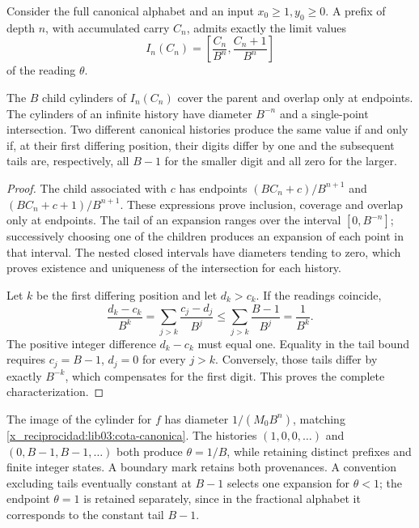 Consider the full canonical alphabet and an input
\(x_0\geq1,y_0\geq0\). A prefix of depth \(n\), with
accumulated carry \(C_n\), admits exactly the limit values
\begin{equation}
 I_n(C_n)=\left[\frac{C_n}{B^n},\frac{C_n+1}{B^n}\right]
 \label{x_reciprocidad:lib03:cilindro}
\end{equation}
of the reading \(\theta\).

\begin{theorem}
\label{x_reciprocidad:lib03:teo-cilindros}
The \(B\) child cylinders of \(I_n(C_n)\) cover the parent and
overlap only at endpoints. The cylinders of an infinite history
have diameter \(B^{-n}\) and a single-point intersection.
Two different canonical histories produce the same value if and only
if, at their first differing position, their digits differ by one and the
subsequent tails are, respectively, all \(B-1\) for the smaller
digit and all zero for the larger.
\end{theorem}

\begin{proof}
The child associated with \(c\) has endpoints
\((BC_n+c)/B^{n+1}\) and \((BC_n+c+1)/B^{n+1}\).
These expressions prove inclusion, coverage and overlap only
at endpoints. The tail of an expansion ranges over the interval
\([0,B^{-n}]\); successively choosing one of the children produces an
expansion of each point in that interval. The nested closed
intervals have diameters tending to zero, which proves existence
and uniqueness of the intersection for each history.

Let \(k\) be the first differing position and let \(d_k>c_k\). If the
readings coincide,
\[
 \frac{d_k-c_k}{B^k}
 =\sum_{j>k}\frac{c_j-d_j}{B^j}
 \leq\sum_{j>k}\frac{B-1}{B^j}=\frac1{B^k}.
\]
The positive integer difference \(d_k-c_k\) must equal one. Equality
in the tail bound requires \(c_j=B-1\), \(d_j=0\) for every
\(j>k\). Conversely, those tails differ by exactly
\(B^{-k}\), which compensates for the first digit. This proves the
complete characterization.
\end{proof}

The image of the cylinder for \(f\) has diameter
\(1/(M_0B^n)\), matching \eqref{x_reciprocidad:lib03:cota-canonica}.
The histories \((1,0,0,\ldots)\) and
\((0,B-1,B-1,\ldots)\) both produce \(\theta=1/B\), while retaining
distinct prefixes and finite integer states. A boundary mark
retains both provenances. A convention excluding tails eventually
constant at \(B-1\) selects one expansion for \(\theta<1\);
the endpoint \(\theta=1\) is retained separately, since in the
fractional alphabet it corresponds to the constant tail \(B-1\).

